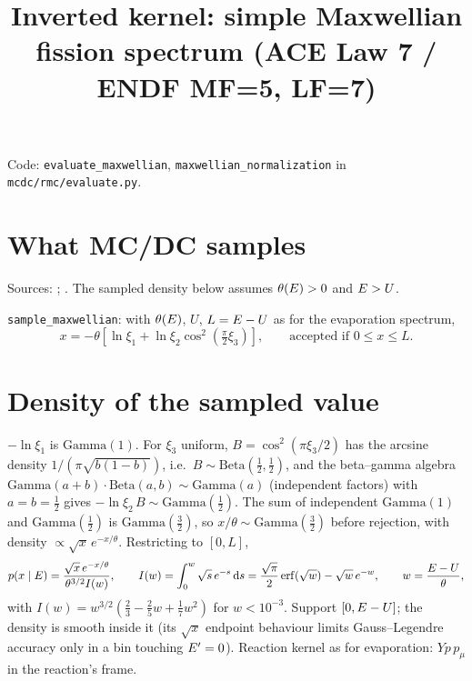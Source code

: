\documentclass[11pt]{article}
\title{Inverted kernel: simple Maxwellian fission spectrum (ACE Law 7 / ENDF MF=5, LF=7)}
\date{}
\begin{document}
\maketitle

\noindent Code: \texttt{evaluate\_maxwellian}, \texttt{maxwellian\_normalization} in
\texttt{mcdc/rmc/evaluate.py}.

\section{What MC/DC samples}

\noindent Sources: ; .
The sampled density below assumes $\theta(E)>0$ and $E>U$.

\texttt{sample\_maxwellian}: with $\theta(E)$, $U$, $L = E - U$ as for the
evaporation spectrum,
\begin{equation}
  x = -\theta\left[\ln\xi_1 + \ln\xi_2\cos^2\!\left(\tfrac{\pi}{2}\xi_3\right)\right],
  \qquad\text{accepted if } 0 \le x \le L .
\end{equation}

\section{Density of the sampled value}

$-\ln\xi_1$ is $\mathrm{Gamma}(1)$. For $\xi_3$ uniform, $B = \cos^2(\pi\xi_3/2)$ has
the arcsine density $1/(\pi\sqrt{b(1-b)})$, i.e.\ $B \sim \mathrm{Beta}(\tfrac12,
\tfrac12)$, and the beta--gamma algebra
$\mathrm{Gamma}(a+b)\cdot\mathrm{Beta}(a, b) \sim \mathrm{Gamma}(a)$ (independent
factors) with $a = b = \tfrac12$ gives $-\ln\xi_2\,B \sim \mathrm{Gamma}(\tfrac12)$.
The sum of independent $\mathrm{Gamma}(1)$ and $\mathrm{Gamma}(\tfrac12)$ is
$\mathrm{Gamma}(\tfrac32)$, so $x/\theta \sim \mathrm{Gamma}(\tfrac32)$ before
rejection, with density $\propto\sqrt{x}\,e^{-x/\theta}$. Restricting to $[0, L]$,
\begin{equation}
  p(x \mid E) = \frac{\sqrt{x}\,e^{-x/\theta}}{\theta^{3/2} I(w)},\qquad
  I(w) = \int_0^w\sqrt{s}\,e^{-s}\,\mathrm{d} s
  = \frac{\sqrt\pi}{2}\operatorname{erf}(\sqrt w) - \sqrt w\,e^{-w},
  \qquad w = \frac{E - U}{\theta},
\end{equation}
with $I(w) = w^{3/2}\left(\tfrac23 - \tfrac25 w + \tfrac17 w^2\right)$ for
$w < 10^{-3}$. Support $[0, E - U]$; the density is smooth inside it (its
$\sqrt{x}$ endpoint behaviour limits Gauss--Legendre accuracy only in a bin touching
$E' = 0$). Reaction kernel as for evaporation: $Y p\,p_\mu$ in the reaction's frame.
\end{document}
